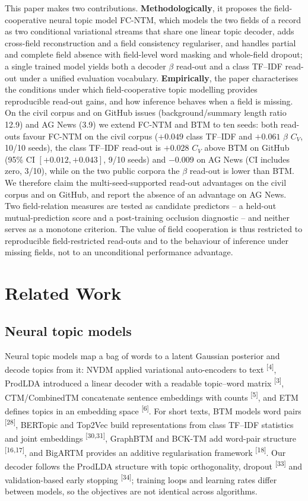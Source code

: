 \documentclass{article}
\begin{document}
This paper makes two contributions. \textbf{Methodologically}, it proposes the field-cooperative
neural topic model FC-NTM, which models the two fields of a record as two conditional variational
streams that share one linear topic decoder, adds cross-field reconstruction and a field
consistency regulariser, and handles partial and complete field absence with field-level word
masking and whole-field dropout; a single trained model yields both a decoder $\beta$ read-out and
a class TF--IDF read-out under a unified evaluation vocabulary. \textbf{Empirically}, the paper characterises the conditions under which field-cooperative topic
modelling provides reproducible read-out gains, and how inference behaves when a field is missing.
On the civil corpus and on GitHub issues (background/summary length ratio 12.9) and AG News (3.9)
we extend FC-NTM and BTM to ten seeds: both read-outs favour FC-NTM on the civil corpus
($+0.049$ class TF--IDF and $+0.061$ $\beta$ $C_V$, 10/10 seeds), the class TF--IDF read-out is
$+0.028$ $C_V$ above BTM on GitHub (95\% CI $[+0.012,+0.043]$, 9/10 seeds) and $-0.009$ on AG News
(CI includes zero, 3/10), while on the two public corpora the $\beta$ read-out is lower than BTM.
We therefore claim the multi-seed-supported read-out advantages on the civil corpus and on GitHub,
and report the absence of an advantage on AG News. Two field-relation measures
are tested as candidate predictors -- a held-out mutual-prediction score and a post-training
occlusion diagnostic -- and neither serves as a monotone criterion. The value of field cooperation
is thus restricted to reproducible field-restricted read-outs and to the behaviour of inference
under missing fields, not to an unconditional performance advantage.

\section{Related Work}

\subsection{Neural topic models}

Neural topic models map a bag of words to a latent Gaussian posterior and decode topics from it:
NVDM applied variational auto-encoders to text \textsuperscript{[4]}, ProdLDA introduced a linear
decoder with a readable topic--word matrix \textsuperscript{[3]}, CTM/CombinedTM concatenate
sentence embeddings with counts \textsuperscript{[5]}, and ETM defines topics in an embedding space
\textsuperscript{[6]}. For short texts, BTM models word pairs \textsuperscript{[28]}, BERTopic and Top2Vec
build representations from class TF--IDF statistics and joint embeddings
\textsuperscript{[30,31]}, GraphBTM and BCK-TM add word-pair structure
\textsuperscript{[16,17]}, and BigARTM provides an additive regularisation framework
\textsuperscript{[18]}. Our decoder follows the ProdLDA structure with topic orthogonality,
dropout \textsuperscript{[33]} and validation-based early stopping \textsuperscript{[34]};
training loops and learning rates differ between models, so the objectives are not identical
across algorithms.
\end{document}
